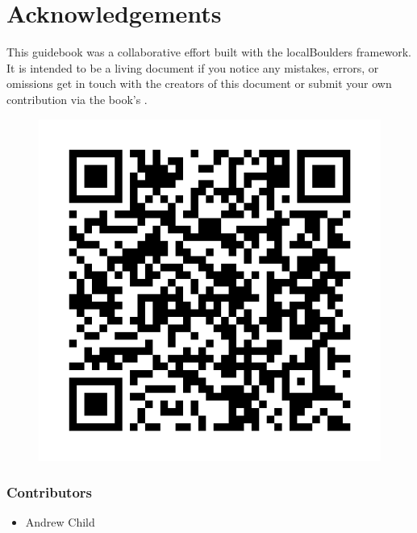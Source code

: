 \chapter{Acknowledgements}
\lhead{\textcolor{\chapterColor}{\rule[-2pt]{\textwidth}{15pt}}}
This guidebook was a collaborative effort built with the localBoulders framework. It is intended to be a living document if you notice any mistakes, errors, or omissions get in touch with the creators of this document or submit your own contribution via the book's .
  \begin{figure}[h]
    \centering
      \captionsetup{labelformat=empty}
      \includegraphics[width=\linewidth]{./maps/qr/The Garden Boulders_qr.png}
      \caption{}
  \end{figure}
\subsection*{Contributors}
\begin{itemize}
\item Andrew Child
\end{itemize}
\clearpage